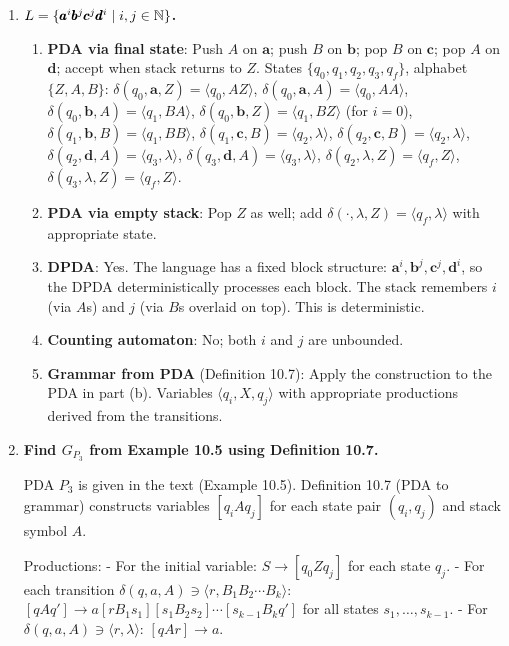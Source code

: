 \begin{enumerate}[{10.}1. ]
\item \textbf{$L=\{\pmb{a}^i\pmb{b}^j\pmb{c}^j\pmb{d}^i \mid i,j\in\mathbb{N}\}$.}

\begin{enumerate}
\item \textbf{PDA via final state}: Push $A$ on $\pmb{a}$; push $B$ on $\pmb{b}$; pop $B$ on $\pmb{c}$; pop $A$ on $\pmb{d}$; accept when stack returns to $Z$.
States $\{q_0,q_1,q_2,q_3,q_f\}$, alphabet $\{Z,A,B\}$:
$\delta(q_0,\pmb{a},Z)=\langle q_0,AZ\rangle$, $\delta(q_0,\pmb{a},A)=\langle q_0,AA\rangle$,
$\delta(q_0,\pmb{b},A)=\langle q_1,BA\rangle$, $\delta(q_0,\pmb{b},Z)=\langle q_1,BZ\rangle$ (for $i=0$),
$\delta(q_1,\pmb{b},B)=\langle q_1,BB\rangle$, $\delta(q_1,\pmb{c},B)=\langle q_2,\lambda\rangle$,
$\delta(q_2,\pmb{c},B)=\langle q_2,\lambda\rangle$, $\delta(q_2,\pmb{d},A)=\langle q_3,\lambda\rangle$,
$\delta(q_3,\pmb{d},A)=\langle q_3,\lambda\rangle$, $\delta(q_2,\lambda,Z)=\langle q_f,Z\rangle$, $\delta(q_3,\lambda,Z)=\langle q_f,Z\rangle$.

\item \textbf{PDA via empty stack}: Pop $Z$ as well; add $\delta(\cdot,\lambda,Z)=\langle q_f,\lambda\rangle$ with appropriate state.

\item \textbf{DPDA}: Yes. The language has a fixed block structure: $\pmb{a}^i,\pmb{b}^j,\pmb{c}^j,\pmb{d}^i$, so the DPDA deterministically processes each block. The stack remembers $i$ (via $A$s) and $j$ (via $B$s overlaid on top). This is deterministic.

\item \textbf{Counting automaton}: No; both $i$ and $j$ are unbounded.

\item \textbf{Grammar from PDA} (Definition 10.7): Apply the construction to the PDA in part (b). Variables $\langle q_i, X, q_j\rangle$ with appropriate productions derived from the transitions.
\end{enumerate}

\item \textbf{Find $G_{P_3}$ from Example 10.5 using Definition 10.7.}

PDA $P_3$ is given in the text (Example 10.5). Definition 10.7 (PDA to grammar) constructs variables $[q_i A q_j]$ for each state pair $(q_i,q_j)$ and stack symbol $A$.

Productions:
- For the initial variable: $S \to [q_0 Z q_j]$ for each state $q_j$.
- For each transition $\delta(q,a,A) \ni \langle r, B_1 B_2\cdots B_k\rangle$:
  $[q A q'] \to a [r B_1 s_1][s_1 B_2 s_2]\cdots[s_{k-1} B_k q']$ for all states $s_1,\ldots,s_{k-1}$.
- For $\delta(q,a,A) \ni \langle r,\lambda\rangle$: $[q A r] \to a$.


\end{enumerate}
